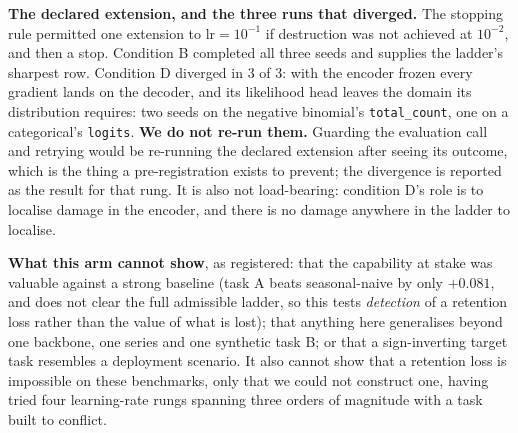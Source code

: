 \textbf{The declared extension, and the three runs that diverged.} The stopping
rule permitted one extension to $\text{lr}{=}10^{-1}$ if destruction was not
achieved at $10^{-2}$, and then a stop.  Condition B completed all three seeds
and supplies the ladder's sharpest row.  Condition D diverged in 3 of 3: with the
encoder frozen every gradient lands on the decoder, and its likelihood head
leaves the domain its distribution requires: two seeds on the negative
binomial's \texttt{total\_count}, one on a categorical's \texttt{logits}.
\textbf{We do not re-run them.}  Guarding the evaluation call and retrying would
be re-running the declared extension after seeing its outcome, which is the thing
a pre-registration exists to prevent; the divergence is reported as the result
for that rung.  It is also not load-bearing: condition D's role is to localise
damage in the encoder, and there is no damage anywhere in the ladder to localise.

\textbf{What this arm cannot show}, as registered: that the capability at stake
was valuable against a strong baseline (task A beats seasonal-naive by only
$+0.081$, and does not clear the full admissible ladder, so this tests
\emph{detection} of a retention loss rather than the value of what is lost); that
anything here generalises beyond one backbone, one series and one synthetic task
B; or that a sign-inverting target task resembles a deployment scenario.  It also
cannot show that a retention loss is impossible on these benchmarks, only that
we could not construct one, having tried four learning-rate rungs spanning three
orders of magnitude with a task built to conflict.

\begin{table}[ht]
\centering
\caption{\textbf{The pre-registered positive control: 21 runs, no destruction.}
Task A is Moirai-Small/ETTh2 $h{=}192$; task B is the anti-persistent synthetic
series, fixed by SHA-256 before any run. ``task B learned'' is the MSE reduction
on B's own held-out windows (registered validity threshold $20\%$).
``retention on task A'' is $100(\text{MSE}_A(\theta_\text{FT}) -
\text{MSE}_A(\theta_\text{ZS}))/\text{MSE}_A(\theta_\text{ZS})$, so
\emph{positive is worse} and the registered destruction threshold is $+50\%$ in a
majority of seeds under full fine-tuning. CKA is measured on \textbf{task A's}
inputs. $\pm$ is the SEM over 3 seeds. $^{\dagger}$ marks the single declared
ladder extension. Read every retention number against the $0.48$~pp evaluator
noise floor derived in the text.}
\label{tab:poscontrol}

\end{table}
